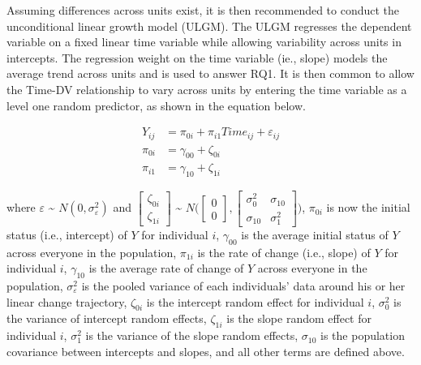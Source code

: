 \documentclass[english,,man]{apa6}
\theoremstyle{definition}
\theoremstyle{definition}
\theoremstyle{definition}
\theoremstyle{remark}
\begin{document}
Assuming differences across units exist, it is then recommended to
conduct the unconditional linear growth model (ULGM). The ULGM regresses
the dependent variable on a fixed linear time variable while allowing
variability across units in intercepts. The regression weight on the
time variable (ie., slope) models the average trend across units and is
used to answer RQ1. It is then common to allow the Time-DV relationship
to vary across units by entering the time variable as a level one random
predictor, as shown in the equation below.

\begin{align}
\label{ULGM}
Y_{ij} &= \pi_{0i} + \pi_{i1}Time_{ij} + \varepsilon_{ij} \\
\pi_{0i} &= \gamma_{00} + \zeta_{0i} \\
\pi_{i1} &= \gamma_{10} + \zeta_{1i}
\end{align}

\noindent \noindent where \(\varepsilon\) \textasciitilde{}
\(N(0, \sigma_{\varepsilon}^2)\) and
\(\begin{bmatrix} \zeta_{0i} \\ \zeta_{1i} \end{bmatrix}\)
\textasciitilde{}
\(N\bigl(\begin{bmatrix} 0 \\ 0 \end{bmatrix}, \begin{bmatrix} \sigma_{0}^2 & \sigma_{10} \\ \sigma_{10} & \sigma_{1}^2\end{bmatrix}\bigr)\),
\(\pi_{0i}\) is now the initial status (i.e., intercept) of \(Y\) for
individual \(i\), \(\gamma_{00}\) is the average initial status of \(Y\)
across everyone in the population, \(\pi_{1i}\) is the rate of change
(i.e., slope) of \(Y\) for individual \(i\), \(\gamma_{10}\) is the
average rate of change of \(Y\) across everyone in the population,
\(\sigma_{\varepsilon}^2\) is the pooled variance of each individuals'
data around his or her linear change trajectory, \(\zeta_{0i}\) is the
intercept random effect for individual \(i\), \(\sigma_{0}^2\) is the
variance of intercept random effects, \(\zeta_{1i}\) is the slope random
effect for individual \(i\), \(\sigma_1^2\) is the variance of the slope
random effects, \(\sigma_{10}\) is the population covariance between
intercepts and slopes, and all other terms are defined above.
\end{document}
